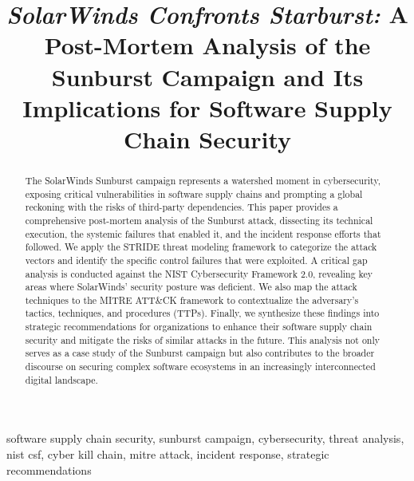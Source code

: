 \documentclass[conference]{IEEEtran}
\begin{document}
\title{\textit{SolarWinds Confronts Starburst:} A Post-Mortem Analysis of the Sunburst Campaign and Its Implications for Software Supply Chain Security}

\author{
}

\maketitle

\begin{abstract}
The SolarWinds Sunburst campaign represents a watershed moment in cybersecurity, exposing critical vulnerabilities in software supply chains and prompting a global reckoning with the risks of third-party dependencies. This paper provides a comprehensive post-mortem analysis of the Sunburst attack, dissecting its technical execution, the systemic failures that enabled it, and the incident response efforts that followed. We apply the STRIDE threat modeling framework to categorize the attack vectors and identify the specific control failures that were exploited. A critical gap analysis is conducted against the NIST Cybersecurity Framework 2.0, revealing key areas where SolarWinds' security posture was deficient. We also map the attack techniques to the MITRE ATT\&CK framework to contextualize the adversary's tactics, techniques, and procedures (TTPs). Finally, we synthesize these findings into strategic recommendations for organizations to enhance their software supply chain security and mitigate the risks of similar attacks in the future. This analysis not only serves as a case study of the Sunburst campaign but also contributes to the broader discourse on securing complex software ecosystems in an increasingly interconnected digital landscape.
\end{abstract}

\begin{IEEEkeywords}
software supply chain security, sunburst campaign, cybersecurity, threat analysis, nist csf, cyber kill chain, mitre attack, incident response, strategic recommendations
\end{IEEEkeywords}
\end{document}
